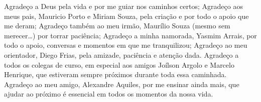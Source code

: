 Agradeço a Deus pela vida e por me guiar nos caminhos certos; Agradeço aos meus pais, Mauricio Porto e Miriam Souza, pela criação e por todo o apoio que me deram; Agradeço também ao meu irmão, Maurílio Souza (mesmo sem merecer\ldots) por torrar paciência; Agradeço a minha namorada, Yasmim Arrais, por todo o apoio, conversas e momentos em que me tranquilizou; Agradeço ao meu orientador, Diego Frias, pela amizade, paciência e atenção dada. Agradeço a todos os colegas de curso, em especial aos amigos Joílson Argolo e Marcelo Henrique, que estiveram sempre próximos durante toda essa caminhada. Agradeço ao meu amigo, Alexandre Aquiles, por me ensinar ainda mais, que ajudar ao próximo é essencial em todos os momentos da nossa vida.